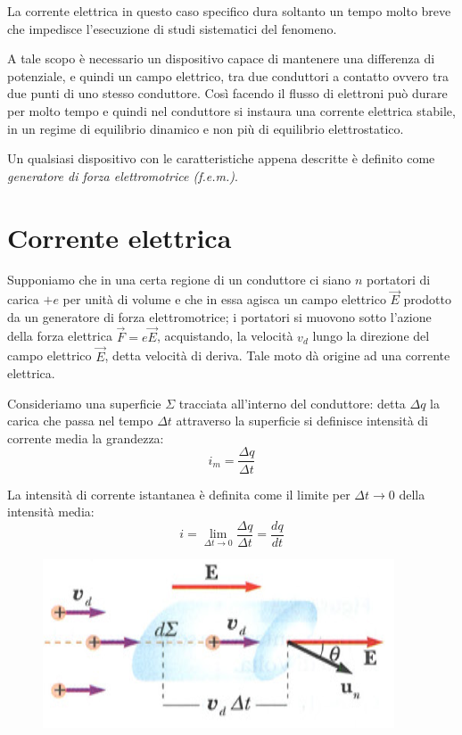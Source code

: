 \documentclass[class=book, crop=false, oneside, 12pt]{standalone}
\begin{document}
La corrente elettrica in questo caso specifico dura soltanto un tempo molto breve che impedisce l'esecuzione di studi sistematici del fenomeno. 

A tale scopo è necessario un dispositivo capace di mantenere una differenza di potenziale, e quindi un campo elettrico, tra due conduttori a contatto ovvero tra due punti di uno stesso conduttore. 
Così facendo il flusso di elettroni può durare per molto tempo e quindi nel conduttore si instaura una corrente elettrica stabile, in un regime di equilibrio dinamico e non più di equilibrio elettrostatico.

Un qualsiasi dispositivo con le caratteristiche appena descritte è definito come \emph{generatore di forza elettromotrice (f.e.m.)}.

\section{Corrente elettrica}

Supponiamo che in una certa regione di un conduttore ci siano \(n\) portatori di carica \(+e\) per unità di volume e che in essa agisca un campo elettrico \(\overrightarrow{E}\) prodotto da un generatore di forza elettromotrice; i portatori si muovono sotto l'azione della forza elettrica \(\overrightarrow{F} = e \overrightarrow{E}\), acquistando, la velocità \(v_d\) lungo la direzione del campo elettrico \(\overrightarrow{E}\), detta velocità di deriva. 
Tale moto dà origine ad una corrente elettrica.

Consideriamo una superficie \(\Sigma\) tracciata all'interno del conduttore: detta \(\Delta q\) la carica che passa nel tempo \(\Delta t\) attraverso la superficie si definisce intensità di corrente media la grandezza:
\begin{equation*}
    i_m = \frac{\Delta q}{\Delta t}
\end{equation*}

La intensità di corrente istantanea è definita come il limite per \(\Delta t \rightarrow 0\) della intensità media:
\begin{equation*}
    i = \lim_{\Delta t \rightarrow 0 } \frac{\Delta q}{\Delta t} = \frac{dq}{dt}
\end{equation*} 

\begin{figure}[h]
    \includegraphics[scale=0.6]{intensita_corrente_superficie.png}
    \centering
    \caption{}
\end{figure}
\end{document}
